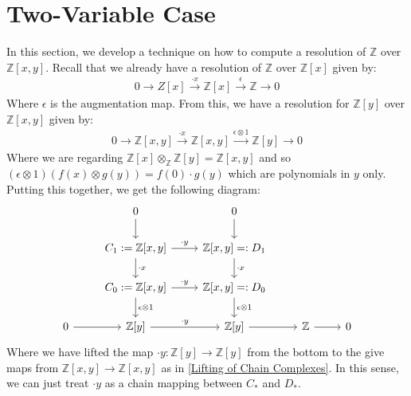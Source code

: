 \documentclass[12pt]{book}
\theoremstyle{definition}
\begin{document}
\section{Two-Variable Case}
In this section, we develop a technique on how to compute a resolution of $\mathbb{Z}$ over $\mathbb{Z}[x,y]$. Recall that we already have a resolution of $\mathbb{Z}$ over $\mathbb{Z}[x]$ given by: 
\begin{align*}
    0 \rightarrow Z[x] \xrightarrow{\cdot x} \mathbb{Z}[x] \xrightarrow{\epsilon} \mathbb{Z} \rightarrow 0
\end{align*}
Where $\epsilon$ is the augmentation map. From this, we have a resolution for $\mathbb{Z}[y]$ over $\mathbb{Z}[x,y]$ given by: 
\begin{align*}
    0 \rightarrow \mathbb{Z}[x,y] \xrightarrow{\cdot x} \mathbb{Z}[x,y] \xrightarrow{\epsilon \otimes 1} \mathbb{Z}[y] \rightarrow 0 
\end{align*}
Where we are regarding $\mathbb{Z}[x] \otimes_\mathbb{Z} \mathbb{Z}[y] = \mathbb{Z}[x,y]$ and so $(\epsilon \otimes 1)(f(x)\otimes g(y)) = f(0) \cdot g(y)$ which are polynomials in $y$ only. Putting this together, we get the following diagram: 
\[
\begin{tikzcd}
    & 0 \arrow[d] & 0 \arrow[d] &\\
    & C_1 : = \mathbb{Z}[x,y] \arrow[d, "\cdot x"] \arrow[r, "\cdot y"] & \mathbb{Z}[x,y] =: D_1 \arrow[d, "\cdot x"] &\\
    & C_0 := \mathbb{Z}[x,y] \arrow[d, "\epsilon \otimes 1"] \arrow[r, "\cdot y"] & \mathbb{Z}[x,y] = :D_0 \arrow[d, "\epsilon \otimes 1"] &\\
    0 \arrow[r] & \mathbb{Z}[y] \arrow[r, "\cdot y"] & \mathbb{Z}[y] \arrow[r] & \mathbb{Z} \arrow[r] & 0
\end{tikzcd}
\]
Where we have lifted the map $\cdot y : \mathbb{Z}[y] \to \mathbb{Z}[y]$ from the bottom to the give maps from $\mathbb{Z}[x,y] \to \mathbb{Z}[x,y]$ as in \ref{Lifting of Chain Complexes}. In this sense, we can just treat $\cdot y$ as a chain mapping between $C_*$ and $D_*$. \\
\end{document}
